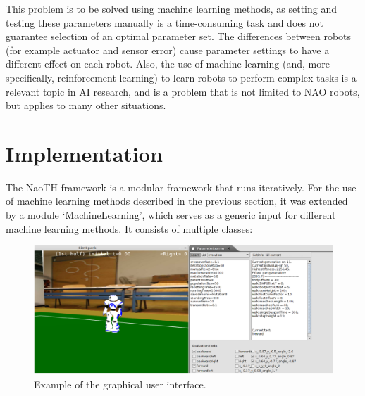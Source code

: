 \documentclass{article}
\begin{document}
This problem is to be solved using machine learning methods, as setting and testing these parameters manually is a time-consuming task and does not guarantee selection of an optimal parameter set. The differences between robots (for example actuator and sensor error) cause parameter settings to have a different effect on each robot. Also, the use of machine learning (and, more specifically, reinforcement learning) to learn robots to perform complex tasks is a relevant topic in AI research, and is a problem that is not limited to NAO robots, but applies to many other situations. 


\section{Implementation}
The NaoTH framework is a modular framework that runs iteratively.  For the use of machine learning methods described in the previous section, it was extended by a module `MachineLearning', which serves as a generic input for different machine learning methods. It consists of multiple classes:

\begin{figure}
	\center
	\includegraphics[width=\textwidth]{images/GUI}
	\caption{Example of the graphical user interface.}
	\label{fig:gui}
\end{figure}
\end{document}
